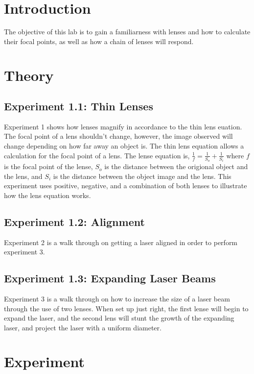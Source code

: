 \documentclass[a4paper,12pt]{article}
\newcommand{\F}[2]{\frac{#1}{#2}}
\begin{document}
\section*{Introduction}
The objective of this lab is to gain a familiarness with lenses and how to calculate their focal points, as well as how a chain of lenses will respond.

\section*{Theory}
\subsection*{Experiment 1.1: Thin Lenses}
Experiment 1 shows how lenses magnify in accordance to the thin lens euation.  The focal point of a lens shouldn't change, however, the image observed will change depending on how far away an object is.  The thin lens equation allows a calculation for the focal point of a lens.  The lense equation is, $\F{1}{f}=\F{1}{S_o}+\F{1}{S_i}$ where $f$ is the focal point of the lense, $S_o$ is the distance between the origional object and the lens, and $S_i$ is the distance between the object image and the lens.  This experiment uses positive, negative, and a combination of both lenses to illustrate how the lens equation works.

\subsection*{Experiment 1.2: Alignment}
Experiment 2 is a walk through on getting a laser aligned in order to perform experiment 3.

\subsection*{Experiment 1.3: Expanding Laser Beams}
Experiment 3 is a walk through on how to increase the size of a laser beam through the use of two lenses.  When set up just right, the first lense will begin to expand the laser, and the second lens will stunt the growth of the expanding laser, and project the laser with a uniform diameter.

\section*{Experiment}
\end{document}
